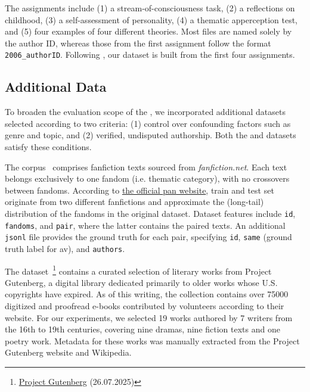The assignments include (1) a stream-of-consciousness task, (2) a reflections on childhood, (3) a self-assessment of personality, (4) a thematic apperception test, and (5) four examples of four different theories.
Most files are named solely by the author ID, whereas those from the first assignment follow the format \texttt{2006\_authorID}.
Following \citet{koppel_determining_2014}, our dataset is built from the first four assignments. 


\subsection{Additional Data}
\label{subsec:additional_data}
To broaden the evaluation scope of the \impAppr{}, we incorporated additional datasets selected according to two criteria:
(1) control over confounding factors such as genre and topic, and 
(2) verified, undisputed authorship.
Both the \dataPan{} and \dataGutenberg{} datasets satisfy these conditions.

The \dataPan{} corpus~\citep{bischoff_importance_2020} comprises fanfiction texts sourced from \textit{fanfiction.net}.
Each text belongs exclusively to one fandom (i.e. thematic category), with no crossovers between fandoms.
According to \href{https://pan.webis.de/clef20/pan20-web/author-identification.html}{the official \ac{pan} website}, 
train and test set originate from two different fanfictions and approximate the (long-tail) distribution of the fandoms in the original dataset.
Dataset features include \texttt{id}, \texttt{fandoms}, and \texttt{pair}, where the latter contains the paired texts.
An additional \texttt{jsonl} file provides the ground truth for each pair, specifying \texttt{id}, \texttt{same} (ground truth label for \ac{av}), and \texttt{authors}.

The \dataGutenberg{} dataset~\footnote{\href{https://www.gutenberg.org/}{Project Gutenberg} (26.07.2025)} contains a curated selection of literary works from Project Gutenberg, a digital library dedicated primarily to older works whose U.S. copyrights have expired.
As of this writing, the collection contains over \num{75000} digitized and proofread e-books contributed by volunteers according to their website.
For our experiments, we selected 19 works authored by 7 writers from the 16th to 19th centuries, covering nine dramas, nine fiction texts and one poetry work.
Metadata for these works was manually extracted from the Project Gutenberg website and Wikipedia.


